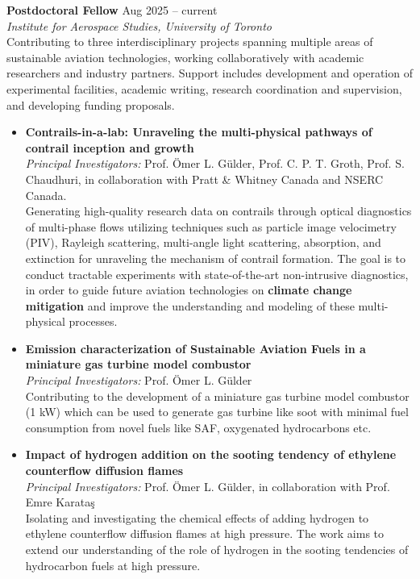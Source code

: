 \documentclass[11pt,a4paper]{article}
\begin{document}
	\noindent\textbf{Postdoctoral Fellow} \hfill {Aug 2025 -- current} \\
	\emph{Institute for Aerospace Studies, University of Toronto} \\
	Contributing to three interdisciplinary projects spanning multiple areas of sustainable aviation technologies, working collaboratively with academic researchers and industry partners. Support includes development and operation of experimental facilities, academic writing, research coordination and supervision, and developing funding proposals.\vspace*{6pt}
	\begin{itemize}[label=$\bullet$]
		\item {\bf Contrails-in-a-lab: Unraveling the multi-physical pathways of contrail inception and growth}\\
		{{\it Principal Investigators:} Prof. \"{O}mer L. G\"{u}lder, Prof. C. P. T. Groth, Prof. S. Chaudhuri, in collaboration with Pratt \& Whitney Canada and NSERC Canada.}\\
		{Generating high-quality research data on contrails through optical diagnostics of multi-phase flows utilizing techniques such as particle image velocimetry (PIV), Rayleigh	scattering, multi-angle light scattering, absorption, and extinction for unraveling the mechanism of contrail formation. The goal is to conduct tractable experiments with state-of-the-art non-intrusive diagnostics, in order to guide future aviation technologies on \textbf{climate change mitigation} and improve the understanding and modeling of these multi-physical processes.}\vspace*{6pt}
		\item {\bf Emission characterization of Sustainable Aviation Fuels in a miniature gas turbine model combustor}\\
		{{\it Principal Investigators:} Prof. \"{O}mer L. G\"{u}lder}\\
		{Contributing to the development of a miniature gas turbine model combustor (1 kW) which can be used to generate gas turbine like soot with minimal fuel consumption from novel fuels like SAF, oxygenated hydrocarbons etc.}\vspace*{6pt}
		\item {\bf Impact of hydrogen addition on the sooting tendency of ethylene counterflow diffusion flames}\\
		{{\it Principal Investigators:} Prof. \"{O}mer L. G\"{u}lder, in collaboration with Prof. Emre Karata\c{s}}\\
		{Isolating and investigating the chemical effects of adding hydrogen to ethylene counterflow diffusion flames at high pressure. The work aims to extend our understanding of the role of hydrogen in the sooting tendencies of hydrocarbon fuels at high pressure.}
	\end{itemize}
\end{document}
